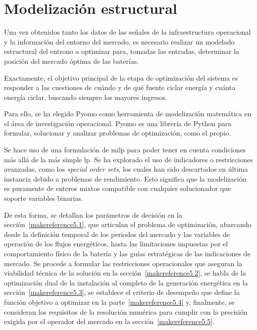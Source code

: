 \cleardoublepage

\chapter{Modelización estructural}
\label{makereference5}

Una vez obtenidos tanto los datos de las señales de la infraestructura operacional y la información del entorno del mercado, es necesario realizar un modelado estructural del entrono a optimizar para, tomadas las entradas, determinar la posición del mercado óptima de las baterías.

Exactamente, el objetivo principal de la etapa de optimización del sistema es responder a las cuestiones de cuándo y de qué fuente ciclar energía y cuánta energía ciclar, buscando siempre los mayores ingresos.

Para ello, se ha elegido Pyomo como herramienta de modelización matemática en el área de investigación operacional. Pyomo es una librería de Python para formular, solucionar y analizar problemas de optimización, como el propio.

Se hace uso de una formulación de \gls{milp} para poder tener en cuenta condiciones más allá de la más simple \gls{lp}. Se ha explorado el uso de indicadores o restricciones avanzadas, como los \textit{special order sets}, los cuales han sido descartados en última instancia debido a problemas de rendimiento. Esto significa que la modelización es puramente de enteros mixtos compatible con cualquier solucionador que soporte variables binarias.

De esta forma, se detallan los parámetros de decisión en la sección~\ref{makereference5.1}, que articulan el problema de optimización, abarcando desde la definición temporal de los periodos del mercado y las variables de operación de los flujos energéticos, hasta las limitaciones impuestas por el comportamiento físico de la batería y las guías estratégicas de las indicaciones de mercado. Se procede a formular las restricciones operacionales que aseguran la viabilidad técnica de la solución en la sección~\ref{makereference5.2}, se habla de la optimización dual de la instalación al completo de la generación energética en la sección~\ref{makereference5.3}, se establece el criterio de desempeño que define la función objetivo a optimizar en la parte~\ref{makereference5.4} y, finalmente, se consideran los requisitos de la resolución numérica para cumplir con la precisión exigida por el operador del mercado en la sección~\ref{makereference5.5}.

